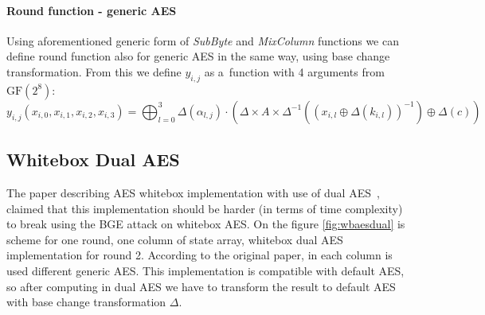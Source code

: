 \documentclass[11pt,oneside,final]{fithesis2}
\newcommand{\gfe}{\ensuremath{\text{GF}\left(2^8\right)}}
\begin{document}
	\paragraph*{Round function - generic AES}
	Using aforementioned generic form of \emph{SubByte} and \emph{MixColumn} functions we can define round function also for generic AES in the same way, using base change transformation.
	From this we define $y_{i,j}$ as a~function with 4 arguments from $\gfe$:
	\begin{equation}
	y_{i,j}\left(x_{i,0}, x_{i,1}, x_{i,2}, x_{i,3}\right) = \bigoplus^3_{l=0} \Delta(\alpha_{l,j}) \cdot \left( \Delta \times A \times \Delta^{-1} \left( \left(x_{i,l} \oplus \Delta\left(k_{i,l}\right) \right)^{-1} \right) \oplus \Delta \left(c\right) \right)
	\end{equation}

	\subsection{Whitebox Dual AES}\label{sec:wb_dual_aes}
	The paper describing AES whitebox implementation with use of dual AES~\citep{Karroumi:2010:PWA:2041036.2041060}, claimed that this implementation should be harder (in terms of time complexity)
	to break using the BGE attack on whitebox AES. On the figure \ref{fig:wbaesdual} is scheme for one round, one column of state array, whitebox dual AES implementation for round 2.
	According to the original paper, in each
	column is used different generic AES. This implementation is compatible with default AES, so after computing in dual AES we have to transform the result to default AES
	with base change transformation $\Delta$.\\
\end{document}
